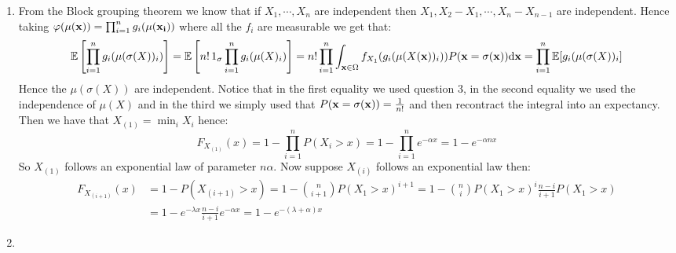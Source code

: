 \documentclass[10pt,a4paper]{article}
\begin{document}
\begin{enumerate}
\item From the Block grouping theorem we know that if $X_1, \cdots, X_n$ are independent then $X_1, X_2 - X_1, \cdots, X_{n} - X_{n-1}$ are independent. Hence taking $\varphi(\mu(\vb{x})) = \prod_{i = 1}^n g_i(\mu(\vb{x_i}))$ where all the $f_i$ are measurable we get that:
\[
\mathbb{E}\left[\prod_{i = 1}^n g_i(\mu(\sigma(X))_i)\right] = \mathbb{E}\left[ n!\, 1_\sigma \prod_{i = 1}^n g_i(\mu(X)_i)\right] = n! \prod_{i = 1}^n \int_{\vb{x} \in \Omega} f_{X_1}(g_i(\mu(X(\vb{x}))_i)) P(\vb{x} = \sigma(\vb{x})) \dd \vb{x} = \prod_{i = 1}^n \mathbb{E}[g_i(\mu(\sigma(X))_i] 
\] 
Hence the $\mu(\sigma(X))$ are independent. Notice that in the first equality we used question 3, in the second equality we used the independence of $\mu(X)$ and in the third we simply used that $P(\vb{x} = \sigma(\vb{x})) = \frac{1}{n!}$ and then recontract the integral into an expectancy.
Then we have that $X_{(1)} = \min_i X_i$ hence:
\[
F_{X_{(1)}}(x) = 1 - \prod_{i = 1}^n P(X_i > x) = 1 - \prod_{i = 1}^n e^{- \alpha x} = 1 - e^{- \alpha n x}
\]
So $X_{(1)}$ follows an exponential law of parameter $n \alpha$. Now suppose $X_{(i)}$ follows an exponential law then:
\begin{align*}
F_{X_{(i + 1)}}(x) &= 1 - P(X_{(i+1)} > x) = 1 - \binom{n}{i+1} P(X_1 > x)^{i + 1} = 1 - \binom{n}{i} P(X_1 > x)^i \frac{n - i}{i + 1} P(X_1 > x)\\
&= 1 - e^{-\lambda x}\frac{n - i}{i + 1}e^{-\alpha x} = 1 - e^{-(\lambda + \alpha)x}
\end{align*}

\item 

\end{enumerate}
\end{document}
